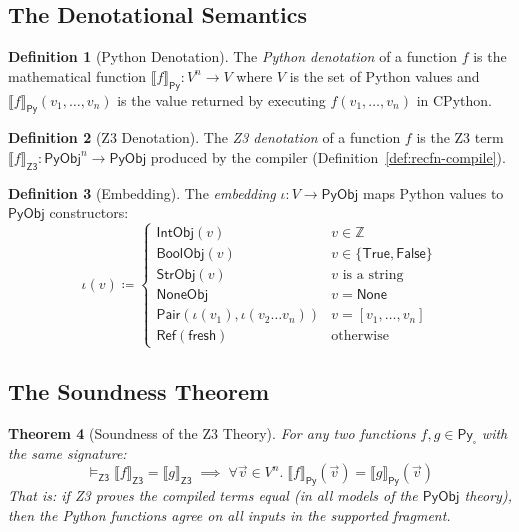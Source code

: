 \documentclass[11pt,a4paper]{report}
\theoremstyle{definition}
\newtheorem{definition}{Definition}[chapter]
\theoremstyle{plain}
\newtheorem{theorem}[definition]{Theorem}
\newcommand{\den}[1]{\llbracket #1 \rrbracket}
\newcommand{\Int}{\mathbb{Z}}
\newcommand{\PyObj}{\mathsf{PyObj}}
\begin{document}
\subsection{The Denotational Semantics}

\begin{definition}[Python Denotation]
\label{def:py-denotation}
The \emph{Python denotation} of a function $f$ is the mathematical
function $\den{f}_\mathsf{Py} : V^n \to V$ where $V$ is the set
of Python values and $\den{f}_\mathsf{Py}(v_1, \ldots, v_n)$ is
the value returned by executing $f(v_1, \ldots, v_n)$ in CPython.
\end{definition}

\begin{definition}[Z3 Denotation]
\label{def:z3-denotation}
The \emph{Z3 denotation} of a function $f$ is the Z3 term
$\den{f}_\mathsf{Z3} : \PyObj^n \to \PyObj$ produced by the
compiler (Definition~\ref{def:recfn-compile}).
\end{definition}

\begin{definition}[Embedding]
\label{def:value-embedding}
The \emph{embedding} $\iota : V \to \PyObj$ maps Python values
to $\PyObj$ constructors:
\[
  \iota(v) \coloneqq \begin{cases}
    \mathsf{IntObj}(v) & v \in \Int \\
    \mathsf{BoolObj}(v) & v \in \{\mathsf{True}, \mathsf{False}\} \\
    \mathsf{StrObj}(v) & v \text{ is a string} \\
    \mathsf{NoneObj} & v = \mathsf{None} \\
    \mathsf{Pair}(\iota(v_1), \iota(v_2\ldots v_n)) &
      v = [v_1, \ldots, v_n] \\
    \mathsf{Ref}(\mathsf{fresh}) & \text{otherwise}
  \end{cases}
\]
\end{definition}

\subsection{The Soundness Theorem}

\begin{theorem}[Soundness of the Z3 Theory]
\label{thm:z3-soundness}
For any two functions $f, g \in \mathsf{Py}_\square$ with the
same signature:
\[
  \models_{\mathsf{Z3}} \den{f}_\mathsf{Z3} = \den{g}_\mathsf{Z3}
  \;\implies\;
  \forall \vec{v} \in V^n.\;
    \den{f}_\mathsf{Py}(\vec{v}) = \den{g}_\mathsf{Py}(\vec{v})
\]
That is: if Z3 proves the compiled terms equal (in all models of
the $\PyObj$ theory), then the Python functions agree on all inputs
in the supported fragment.
\end{theorem}
\end{document}
